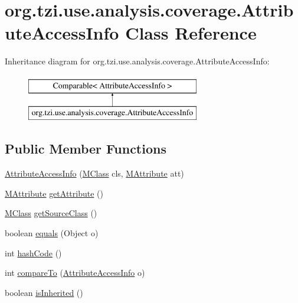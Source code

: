 \hypertarget{classorg_1_1tzi_1_1use_1_1analysis_1_1coverage_1_1_attribute_access_info}{\section{org.\-tzi.\-use.\-analysis.\-coverage.\-Attribute\-Access\-Info Class Reference}
\label{classorg_1_1tzi_1_1use_1_1analysis_1_1coverage_1_1_attribute_access_info}
}
Inheritance diagram for org.\-tzi.\-use.\-analysis.\-coverage.\-Attribute\-Access\-Info\-:\begin{figure}[H]
\begin{center}
\leavevmode
\includegraphics[height=2.000000cm]{classorg_1_1tzi_1_1use_1_1analysis_1_1coverage_1_1_attribute_access_info}
\end{center}
\end{figure}
\subsection*{Public Member Functions}
\begin{DoxyCompactItemize}
\item 
\hyperlink{classorg_1_1tzi_1_1use_1_1analysis_1_1coverage_1_1_attribute_access_info_a7578190464ec3f0524595c789db514cf}{Attribute\-Access\-Info} (\hyperlink{interfaceorg_1_1tzi_1_1use_1_1uml_1_1mm_1_1_m_class}{M\-Class} cls, \hyperlink{classorg_1_1tzi_1_1use_1_1uml_1_1mm_1_1_m_attribute}{M\-Attribute} att)
\item 
\hyperlink{classorg_1_1tzi_1_1use_1_1uml_1_1mm_1_1_m_attribute}{M\-Attribute} \hyperlink{classorg_1_1tzi_1_1use_1_1analysis_1_1coverage_1_1_attribute_access_info_a77828124b7d83f4990f77f8e64849087}{get\-Attribute} ()
\item 
\hyperlink{interfaceorg_1_1tzi_1_1use_1_1uml_1_1mm_1_1_m_class}{M\-Class} \hyperlink{classorg_1_1tzi_1_1use_1_1analysis_1_1coverage_1_1_attribute_access_info_ad14106740db06b6d9e0d5a7d2a9d1c00}{get\-Source\-Class} ()
\item 
boolean \hyperlink{classorg_1_1tzi_1_1use_1_1analysis_1_1coverage_1_1_attribute_access_info_a34512274c9db48947285c7d61d423036}{equals} (Object o)
\item 
int \hyperlink{classorg_1_1tzi_1_1use_1_1analysis_1_1coverage_1_1_attribute_access_info_ae57d40f0f08dfb0d79bf335c238900a5}{hash\-Code} ()
\item 
int \hyperlink{classorg_1_1tzi_1_1use_1_1analysis_1_1coverage_1_1_attribute_access_info_a77e946593d70cffab8bededaa5ff18cf}{compare\-To} (\hyperlink{classorg_1_1tzi_1_1use_1_1analysis_1_1coverage_1_1_attribute_access_info}{Attribute\-Access\-Info} o)
\item 
boolean \hyperlink{classorg_1_1tzi_1_1use_1_1analysis_1_1coverage_1_1_attribute_access_info_abdfa7b19509a509620bd07fdc7d9702b}{is\-Inherited} ()
\end{DoxyCompactItemize}


